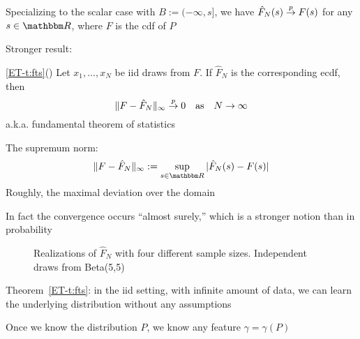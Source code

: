 \begin{frame}
    
    \vspace{2em}
    Specializing to the scalar case with $B := (-\infty, s]$, we 
    have $\hat F_N(s) \stackrel { p } {\to} F(s)$ for any $s \in
    \RR$, where $F$ is the {\sc cdf} of $P$
    
    \vspace{.7em}
    Stronger result:
    
    \Thm \eqref{ET-t:fts}()
    Let $x_1, \ldots, x_N$ be {\sc iid} draws from $F$.  If $\hat F_N$ is the
    corresponding {\sc ecdf},  then
    \begin{equation*}
        \label{eq:dev}
        \| F - \hat F_N \|_{\infty}
        \stackrel { p } {\to} 0
        \quad \text{as} \quad
        N \to \infty
    \end{equation*}
    a.k.a. fundamental theorem of statistics 
    
\end{frame}

\begin{frame}

    \vspace{2em}
    The supremum norm:
    \begin{equation*}
        \| F - \hat F_N \|_{\infty}
        := \sup_{s \in \RR} |\hat F_N(s) - F(s)| 
    \end{equation*}
    Roughly, the maximal deviation over the domain
    
    \vspace{2em}
    In fact the
    convergence occurs ``almost surely,'' which is a stronger notion than in
    probability
    
\end{frame}

\begin{frame}

    \begin{figure}
   \begin{center}
    \caption{\label{f:ecdf_lim} Realizations of $\hat F_N$ with four different
    sample sizes. Independent draws from Beta(5,5)}
   \end{center}
    \end{figure}
    
\end{frame}

\begin{frame}

    \vspace{2em}
    Theorem~\ref{ET-t:fts}: in the {\sc iid} setting, with infinite amount 
    of data, we can learn the underlying distribution without any assumptions
    
    \vspace{.7em}
    Once
    we know the distribution $P$, we know any feature $\gamma = \gamma(P)$
    
\end{frame}

